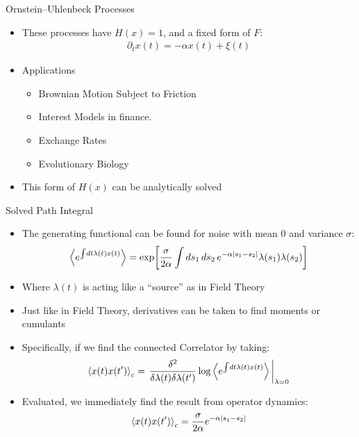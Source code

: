 \documentclass{beamer}
\def\D{\partial}
\begin{document}
\begin{frame}{Ornstein–Uhlenbeck Processes}
  \begin{itemize}
  \item These processes have $H(x)=1$, and a fixed form of $F$:
    \begin{align*}
      \D_t x(t)=-\alpha x(t)+\xi(t)
    \end{align*}
  \item Applications
    \begin{itemize}
    \item Brownian Motion Subject to Friction
    \item Interest Models in finance.
    \item Exchange Rates
    \item Evolutionary Biology
    \end{itemize}
  \item This form of $H(x)$ can be analytically solved
  \end{itemize}
\end{frame}
\begin{frame}{Solved Path Integral}
  \begin{itemize}
  \item The generating functional can be found for noise with mean $0$ and variance $\sigma$:
    \begin{align*}
      \ev{e^{\int\dd{t}\lambda(t)x(t)}}=
      \exp[\frac\sigma{2\alpha}\int\dd{s_1}\dd{s_2}e^{-\alpha\abs{s_1-s_2}}
      \lambda(s_1)\lambda(s_2)]
    \end{align*}
  \item Where $\lambda(t)$ is acting like a ``source'' as in Field Theory
  \item Just like in Field Theory, derivatives can be taken to find moments or cumulants
  \item Specifically, if we find the connected Correlator by taking:
    \begin{align*}
      \ev{x(t)x(t')}_c=
      \eval{\frac{\delta^2}{\delta\lambda(t)\delta\lambda(t')}
      \log\ev{e^{\int\dd{t}\lambda(t)x(t)}}}_{\lambda=0}
    \end{align*}
  \item Evaluated, we immediately find the result from operator dynamics:
    \begin{align*}
      \ev{x(t)x(t')}_c=\frac{\sigma}{2\alpha}e^{-\alpha\abs{s_1-s_2}}
    \end{align*}
  \end{itemize}
\end{frame}
\end{document}
